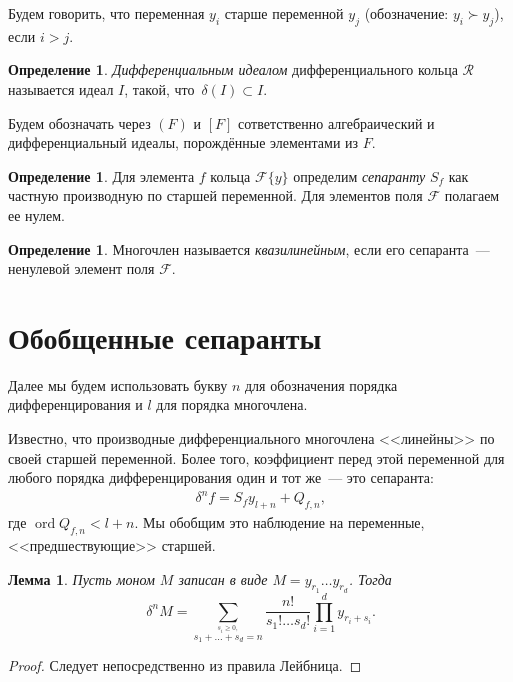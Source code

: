 \documentclass[11pt]{article}
\DeclareMathOperator{\ord}{ord}
\renewcommand{\ge}{\geqslant}
\newcommand{\diffField}{\mathcal{F}}
\newtheorem{lemma}[theorem1]{Лемма}
\theoremstyle{plain}
\theoremstyle{definition}
\newtheorem{definition}[theorem2]{Определение}
\theoremstyle{remark}
\begin{document}
Будем говорить, что переменная $y_i$ старше переменной $y_j$ (обозначение: $y_i \succ y_j$), если $i>j$.

\begin{definition}
\emph{Дифференциальным идеалом} дифференциального кольца $\mathcal{R}$ называется идеал $I$, такой, что $\,\delta(I)\subset I$.
\end{definition}

Будем обозначать через $(F)$ и $[F]$ сответственно алгебраический и дифференциальный идеалы, порождённые элементами из $F$.

\begin{definition}
Для элемента $f$ кольца $\diffField\{y\}$ определим \emph{сепаранту} $S_f$
как частную производную по старшей переменной. Для элементов поля $\diffField$ полагаем ее нулем.
\end{definition}

\begin{definition} Многочлен называется \emph{квазилинейным}, если
его сепаранта~--- ненулевой элемент поля $\diffField$.
\end{definition}



\section{Обобщенные сепаранты}
\label{generalized_separants}
Далее мы будем использовать букву $n$ для обозначения порядка дифференцирования и $l$ для порядка многочлена.

Известно, что производные дифференциального многочлена <<линейны>> по своей старшей переменной. Более того, коэффициент перед этой переменной для любого порядка дифференцирования один и тот же~--- это сепаранта:
\begin{gather}
\label{separant_formula}
 \,\delta^n f = S_f y_{l+n} + Q_{f,n},
\end{gather}
где $\ord Q_{f,n} < l + n$.
Мы обобщим это наблюдение на переменные, <<предшествующие>> старшей.


\begin{lemma}\label{lemma:der_monom}
Пусть моном $M$ записан в виде $M=y_{r_1}\ldots y_{r_d}$. Тогда
$$
\,\delta^n M =\sum\limits_{\stackrel{s_i\ge0,}{
s_1+\ldots+s_d=n}}\frac{n!}{s_1!\ldots s_d!}
\prod\limits_{i=1}^dy_{r_i+s_i}.
$$
\end{lemma}
\begin{proof}
Следует непосредственно из правила Лейбница.
\end{proof}
\end{document}
